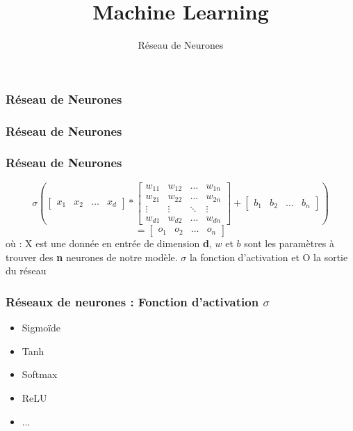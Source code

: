 \documentclass{formation}
\title{Machine Learning}
\subtitle{Réseau de Neurones}
\begin{document}
\maketitle

\begin{frame}
  \frametitle{Réseau de Neurones}
\end{frame}

\begin{frame}
  \frametitle{Réseau de Neurones}
\end{frame}

\begin{frame}
  \frametitle{Réseau de Neurones}
  \[
  \sigma \left(
  \begin{bmatrix}
    x_{1} & x_{2} & \dots & x_{d}
  \end{bmatrix}
  *
  \begin{bmatrix}
    w_{11} & w_{12} & \dots  & w_{1n} \\
    w_{21} & w_{22} & \dots  & w_{2n} \\
    \vdots & \vdots & \ddots & \vdots \\
    w_{d1} & w_{d2} & \dots  & w_{dn}
  \end{bmatrix}
  +
  \begin{bmatrix}
    b_{1} & b_{2} & \dots & b_{n}
  \end{bmatrix}
  \right )
  \]
  \[
  =
  \begin{bmatrix}
    o_{1} & o_{2} & \dots & o_{n}
  \end{bmatrix}
  \]
  \newline
  où :
  \newline
  X est une donnée en entrée de dimension \textbf{d},
  \newline
  $w$ et $b$ sont les paramètres à trouver des \textbf{n} neurones de notre modèle.
  \newline
  $\sigma$ la fonction d'activation et
  \newline
  O la sortie du réseau
\end{frame}

\begin{frame}
  \frametitle{Réseaux de neurones : Fonction d'activation $\sigma$}
  \begin{itemize}
  \item Sigmoïde
  \item Tanh
  \item Softmax
  \item ReLU
  \item ...
  \end{itemize}
\end{frame}
\end{document}

